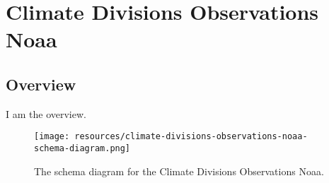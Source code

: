 
\section{Climate Divisions Observations Noaa}
\label{sec:climate-divisions-observations-noaa}
\subsection{Overview}
\label{ssec:overview}

I am the overview.

\begin{figure}[h!]
  \begin{center}
    \texttt{[image: resources/climate-divisions-observations-noaa-schema-diagram.png]}
  \end{center}
  \caption{The schema diagram for the Climate Divisions Observations Noaa.}
  \label{fig:ov-diagram}
\end{figure}


